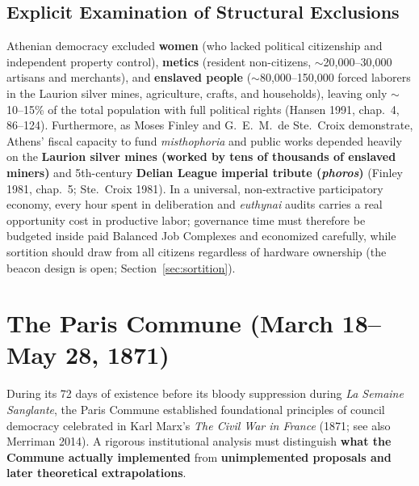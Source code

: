 \documentclass[10pt,twoside,openany]{book}
\theoremstyle{dpepstyle}
\begin{document}
\subsection{Explicit Examination of Structural Exclusions}
Athenian democracy excluded \textbf{women} (who lacked political citizenship and independent property control), \textbf{metics} (resident non-citizens, $\sim$20,000--30,000 artisans and merchants), and \textbf{enslaved people} ($\sim$80,000--150,000 forced laborers in the Laurion silver mines, agriculture, crafts, and households), leaving only $\sim$10--15\% of the total population with full political rights (Hansen 1991, chap.~4, 86--124). Furthermore, as Moses Finley and G.~E.~M.\ de Ste.\ Croix demonstrate, Athens' fiscal capacity to fund \emph{misthophoria} and public works depended heavily on the \textbf{Laurion silver mines (worked by tens of thousands of enslaved miners)} and 5th-century \textbf{Delian League imperial tribute (\emph{phoros})} (Finley 1981, chap.~5; Ste.~Croix 1981). In a universal, non-extractive participatory economy, every hour spent in deliberation and \emph{euthynai} audits carries a real opportunity cost in productive labor; governance time must therefore be budgeted inside paid Balanced Job Complexes and economized carefully, while sortition should draw from all citizens regardless of hardware ownership (the beacon design is open; Section~\ref{sec:sortition}).

\section{The Paris Commune (March 18--May 28, 1871)}
\label{sec:hist-paris}

During its 72 days of existence before its bloody suppression during \emph{La Semaine Sanglante}, the Paris Commune established foundational principles of council democracy celebrated in Karl Marx's \emph{The Civil War in France} (1871; see also Merriman 2014). A rigorous institutional analysis must distinguish \textbf{what the Commune actually implemented} from \textbf{unimplemented proposals and later theoretical extrapolations}.
\end{document}
